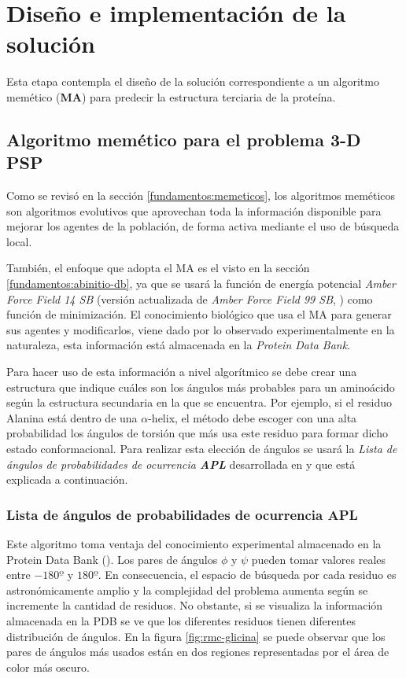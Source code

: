 \chapter{Dise\~no e implementaci\'on de la soluci\'on}
\label{cap:diseno}

Esta etapa contempla el diseño de la solución correspondiente a un algoritmo memético (\textbf{MA}) para predecir la estructura terciaria de la proteína.

\section{Algoritmo memético para el problema 3-D PSP}

Como se revisó en la sección \ref{fundamentos:memeticos}, los algoritmos meméticos son algoritmos evolutivos que aprovechan toda la información disponible para mejorar los agentes de la población, de forma activa mediante el uso de búsqueda local.

También, el enfoque que adopta el MA es el visto en la sección \ref{fundamentos:abinitio-db}, ya que se usará la función de energía potencial \textit{Amber Force Field 14 SB} (versión actualizada de \textit{Amber Force Field 99 SB}, \citealp{amber14}) como función de minimización. El conocimiento biológico que usa el MA para generar sus agentes y modificarlos, viene dado por lo observado experimentalmente en la naturaleza, esta información está almacenada en la \textit{Protein Data Bank}. 
 
Para hacer uso de esta información a nivel algorítmico se debe crear una estructura que indique cuáles son los ángulos más probables para un aminoácido según la estructura secundaria en la que se encuentra. Por ejemplo, si el residuo Alanina está dentro de una $\alpha$-helix, el método debe escoger con una alta probabilidad los ángulos de torsión que más usa este residuo para formar dicho estado conformacional. Para realizar esta elección de ángulos se usará la \textit{Lista de ángulos de probabilidades de ocurrencia \textbf{APL}} desarrollada en \citealp{Dorn:2013} y que está explicada a continuación.

\subsection{Lista de ángulos de probabilidades de ocurrencia APL}
Este algoritmo toma ventaja del conocimiento experimental almacenado en la Protein Data Bank (\citealp{Berman:2000}). Los pares de ángulos $\phi$ y $\psi$ pueden tomar valores reales entre $-180º$ y $180º$. En consecuencia, el espacio de búsqueda por cada residuo es astronómicamente amplio y la complejidad del problema aumenta según se incremente la cantidad de residuos. No obstante, si se visualiza la información almacenada en la PDB se ve que los diferentes residuos tienen diferentes distribución de ángulos. En la figura \ref{fig:rmc-glicina} se puede observar que los pares de ángulos más usados están en dos regiones representadas por el área de color más oscuro.

